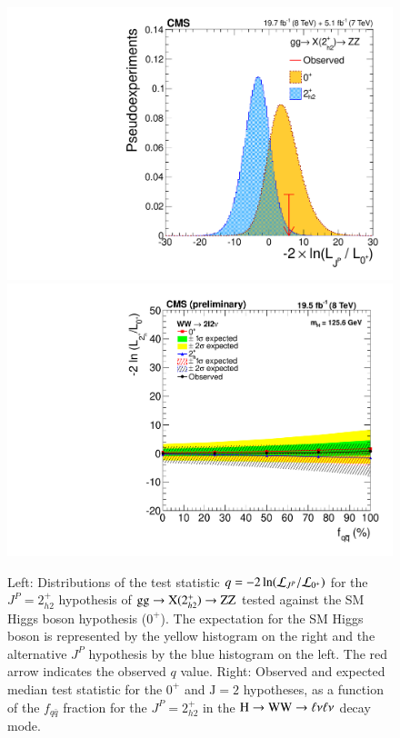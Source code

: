 \begin{figure}[!htbp]
\begin{center}
\centerline{
\includegraphics[width=0.45\linewidth]{figures/hzz_sigsep_combine_gg_2h2+.pdf}
\includegraphics[width=0.45\linewidth]{figures/hww_sigsep_combine_2h2+.pdf}
}
\caption{ Left: Distributions of the test statistic $q=-2\ln({\cal L}_{J^P}/{\cal L}_{0^+})$ 
       for the $J^P=2^+_{h2}$ hypothesis of $\mathrm{g}\mathrm{g}\to\mathrm{X}(2^+_{h2})\to \mathrm{Z}\mathrm{Z}$
      tested against the SM Higgs boson hypothesis ($0^+$). 
            The expectation for the SM Higgs boson is represented by the yellow histogram on the right and the alternative $J^P$ hypothesis by the
      blue histogram on the left. The red arrow indicates the observed $q$ value.  
      Right: Observed and expected median test statistic for the $0^+$ and $\mathrm{J}=2$ hypotheses, as a function of the $f_{q\bar{q}}$ fraction for
      the $J^P=2^+_{h2}$ in the $\mathrm{H}\to\mathrm{W}\mathrm{W}\to\ell\nu\ell\nu$ decay mode.
\label{fig:jp_summary_2}}
\end{center}
\end{figure}


